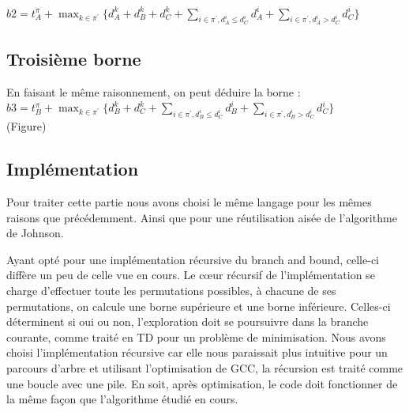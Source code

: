 \documentclass[12pt]{article}
\begin{document}
$b2 = t_A^\pi + \displaystyle\max_{k \in \pi^\prime}\{d_A^k + d_B^k + d_C^k + \displaystyle\sum_{i \in \pi^\prime,d_A^i \le d_C^i} d_A^i + \displaystyle\sum_{i \in \pi^\prime,d_A^i > d_C^i} d_C^i\} $\\

\subsection{Troisième borne}

En faisant le même raisonnement, on peut déduire la borne :\\

$b3 = t_B^\pi + \displaystyle\max_{k \in \pi^\prime}\{d_B^k + d_C^k + \displaystyle\sum_{i \in \pi^\prime,d_B^i \le d_C^i} d_B^i + \displaystyle\sum_{i \in \pi^\prime,d_B^i > d_C^i} d_C^i\} $\\

(Figure)

\subsection{Implémentation}

Pour traiter cette partie nous avons choisi le même langage pour les mêmes raisons que précédemment. Ainsi que pour une réutilisation aisée de l'algorithme de Johnson.

Ayant opté pour une implémentation récursive du branch and bound, celle-ci diffère un peu de celle vue en cours. Le cœur récursif de l'implémentation se charge d'effectuer toute les permutations possibles, à chacune de ses permutations, on calcule une borne supérieure et une borne inférieure. Celles-ci déterminent si oui ou non, l'exploration doit se poursuivre dans la branche courante, comme traité en TD pour un problème de minimisation. Nous avons choisi l'implémentation récursive car elle nous paraissait plus intuitive pour un parcours d'arbre et utilisant l'optimisation de GCC, la récursion est traité comme une boucle avec une pile. En soit, après optimisation, le code doit fonctionner de la même façon que l'algorithme étudié en cours. 








\end{document}
